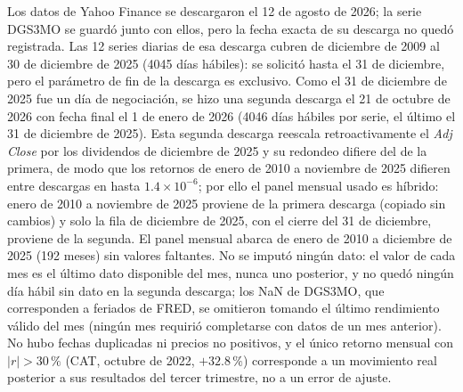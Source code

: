 Los datos de Yahoo Finance se descargaron el 12 de agosto de 2026; la serie DGS3MO se guardó junto con ellos, pero la fecha exacta de su descarga no quedó registrada. Las 12 series diarias de esa descarga cubren de diciembre de 2009 al 30 de diciembre de 2025 (4045 días hábiles): se solicitó hasta el 31 de diciembre, pero el parámetro de fin de la descarga es exclusivo. Como el 31 de diciembre de 2025 fue un día de negociación, se hizo una segunda descarga el 21 de octubre de 2026 con fecha final el 1 de enero de 2026 (4046 días hábiles por serie, el último el 31 de diciembre de 2025). Esta segunda descarga reescala retroactivamente el \emph{Adj Close} por los dividendos de diciembre de 2025 y su redondeo difiere del de la primera, de modo que los retornos de enero de 2010 a noviembre de 2025 difieren entre descargas en hasta $1.4\times10^{-6}$; por ello el panel mensual usado es híbrido: enero de 2010 a noviembre de 2025 proviene de la primera descarga (copiado sin cambios) y solo la fila de diciembre de 2025, con el cierre del 31 de diciembre, proviene de la segunda. El panel mensual abarca de enero de 2010 a diciembre de 2025 (192 meses) sin valores faltantes. No se imputó ningún dato: el valor de cada mes es el último dato disponible del mes, nunca uno posterior, y no quedó ningún día hábil sin dato en la segunda descarga; los NaN de DGS3MO, que corresponden a feriados de FRED, se omitieron tomando el último rendimiento válido del mes (ningún mes requirió completarse con datos de un mes anterior). 
No hubo fechas duplicadas ni precios no positivos, y el único retorno mensual con $|r|>30\,\%$ (CAT, octubre de 2022, $+32.8\,\%$) corresponde a un movimiento real posterior a sus resultados del tercer trimestre, no a un error de ajuste.

